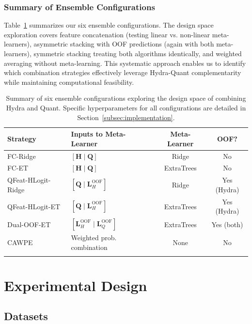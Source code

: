 \documentclass[pdflatex,sn-basic]{sn-jnl}           %
\theoremstyle{thmstyleone}%
\theoremstyle{thmstyletwo}%
\theoremstyle{thmstylethree}%
\begin{document}
\subsubsection{Summary of Ensemble Configurations}

Table~\ref{tab:ensemble_summary} summarizes our six ensemble configurations. The design space exploration covers feature concatenation (testing linear vs. non-linear meta-learners), asymmetric stacking with OOF predictions (again with both meta-learners), symmetric stacking treating both algorithms identically, and weighted averaging without meta-learning. This systematic approach enables us to identify which combination strategies effectively leverage Hydra-Quant complementarity while maintaining computational feasibility.

\begin{table}[h]
\centering
\caption{Summary of six ensemble configurations exploring the design space of combining Hydra and Quant. Specific hyperparameters for all configurations are detailed in Section~\ref{subsec:implementation}.}\label{tab:ensemble_summary}
\small
\begin{tabular}{llcc}
\toprule
\textbf{Strategy} & \textbf{Inputs to Meta-Learner} & \textbf{Meta-Learner} & \textbf{OOF?} \\
\midrule
FC-Ridge & $[\mathbf{H} \mid \mathbf{Q}]$ & Ridge & No \\
FC-ET & $[\mathbf{H} \mid \mathbf{Q}]$ & ExtraTrees & No \\
QFeat-HLogit-Ridge & $[\mathbf{Q} \mid \mathbf{L}_H^{\text{OOF}}]$ & Ridge & Yes (Hydra) \\
QFeat-HLogit-ET & $[\mathbf{Q} \mid \mathbf{L}_H^{\text{OOF}}]$ & ExtraTrees & Yes (Hydra) \\
Dual-OOF-ET & $[\mathbf{L}_H^{\text{OOF}} \mid \mathbf{L}_Q^{\text{OOF}}]$ & ExtraTrees & Yes (both) \\
CAWPE & Weighted prob. combination & None & No \\
\botrule
\end{tabular}
\end{table}

\clearpage

\section{Experimental Design}\label{sec4}

\subsection{Datasets}
\end{document}
